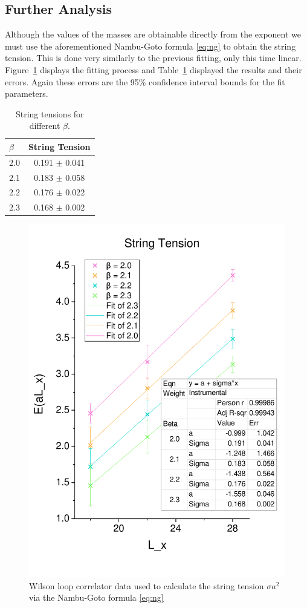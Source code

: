\documentclass[12pt]{article}
\begin{document}
\subsection{Further Analysis}
Although the values of the masses are obtainable directly from the exponent we must use the aforementioned Nambu-Goto formula \eqref{eq:ng} to obtain the string tension. This is done very similarly to the previous fitting, only this time linear. Figure~\ref{fig:stringtension} displays the fitting process and Table~\ref{tab:string} displayed the results and their errors. Again these errors are the 95\% confidence interval bounds for the fit parameters.

\begin{table}
  \centering
    \begin{tabular}{l|c}
$\beta$ &  String Tension \\ \hline
2.0         &   0.191 $\pm$ 0.041 \\
2.1         &   0.183 $\pm$ 0.058 \\
2.2         &   0.176 $\pm$ 0.022 \\
2.3         &   0.168 $\pm$ 0.002 
\end{tabular}
\caption{String tensions for different $\beta$.}
\label{tab:string}
\end{table}

\begin{figure}
\centering
\includegraphics[width=0.8\linewidth]{stringtension.pdf}
\caption{\label{fig:stringtension} Wilson loop correlator data used to calculate the string tension $\sigma a^2$ via the Nambu-Goto formula \eqref{eq:ng}}
\end{figure}
\end{document}
